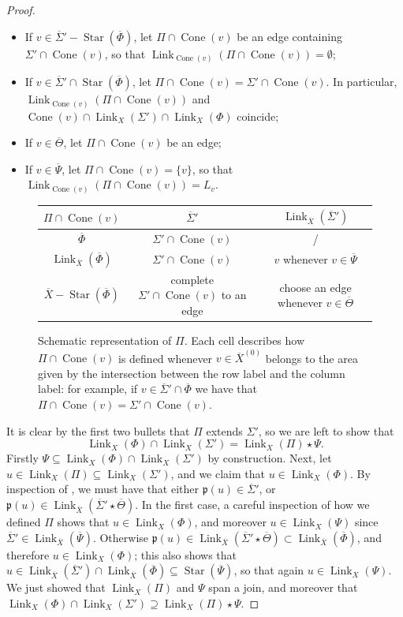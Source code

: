 \documentclass[svgnames]{amsart}
\theoremstyle{plain}
\theoremstyle{definition}
\newcommand{\link}[2]{\operatorname{Link}_{#1}\left(#2\right)}
\newcommand{\CStar}[1]{\operatorname{Star}\left(#1\right)}
\newcommand{\p}{\mathfrak{p}}
\newcommand{\Cone}[1]{\operatorname{Cone}\left(#1\right)}
\newcommand{\ov}[1]{\overline{#1}}
\begin{document}
\begin{proof}
\begin{itemize}
        \item If $v\in \ov\Sigma'-\CStar{\ov\Phi}$, let $\Pi\cap \Cone{v}$ be an edge containing $\Sigma'\cap \Cone{v}$, so that $\link{\Cone{v}}{\Pi\cap \Cone{v}}=\emptyset$;
        \item If $v\in \ov\Sigma'\cap\CStar{\ov\Phi}$, let $\Pi\cap \Cone{v}=\Sigma'\cap \Cone{v}$. In particular, $\link{\Cone{v}}{\Pi\cap \Cone{v}}$ and $\Cone{v}\cap\link{X}{\Sigma'}\cap\link{X}{\Phi}$ coincide;
        \item If $v\in \ov\Theta$, let $\Pi\cap \Cone{v}$ be an edge;
        \item If $v\in \ov\Psi$, let $\Pi\cap \Cone{v}=\{v\}$, so that $\link{\Cone{v}}{\Pi\cap \Cone{v}}=L_v$.
    \end{itemize}

    
\begin{figure}[htp]
\centering
\renewcommand{\arraystretch}{1.5}
\begin{tabular}{c|c|c}
$\Pi\cap \Cone v$&$\ov\Sigma'$&$\link{\ov X}{\ov \Sigma'}$\\
\hline
$\ov\Phi$&  $\Sigma'\cap \Cone v$&/\\
$\link{\ov X}{\ov \Phi}$&$\Sigma'\cap \Cone v$& $v$ whenever $v\in \ov\Psi$\\
$\ov X- \CStar{\ov\Phi}$&complete $\Sigma'\cap \Cone v$ to an edge& choose an edge whenever $v\in \ov\Theta$
\end{tabular}
    \caption{Schematic representation of $\Pi$. Each cell describes how $\Pi\cap \Cone v$ is defined whenever $v\in\ov X^{(0)}$ belongs to the area given by the intersection between the row label and the column label: for example, if $v\in\ov\Sigma'\cap \ov\Phi$ we have that $\Pi\cap \Cone v=\Sigma'\cap \Cone v$.}
    \label{tab:Sigma_star_Pi}
\end{figure}

\noindent It is clear by the first two bullets that $\Pi$ extends $\Sigma'$, so we are left to show that $$\link{X}{\Phi}\cap\link{X}{\Sigma'}=\link{X}{\Pi}\star\Psi.$$ Firstly $\Psi\subseteq\link{X}{\Phi}\cap\link{X}{\Sigma'}$ by construction. Next, let $u\in \link{X}{\Pi}\subseteq \link{X}{\Sigma'}$, and we claim that $u\in \link{X}{\Phi}$. By inspection of , we must have that either $\p(u)\in \ov\Sigma'$, or $\p(u)\in \link{\ov X}{\ov\Sigma'\star\ov \Theta}$. In the first case, a careful inspection of how we defined $\Pi$ shows that $u\in \link{ X}{\Phi}$, and moreover $u\in \link{X}{\Psi}$ since $\ov\Sigma'\in \link{\ov X}{\ov \Psi}$. Otherwise $\p(u)\in \link{\ov X}{\ov\Sigma'\star\ov \Theta}\subset\link{\ov X}{\ov\Phi}$, and therefore $u\in\link{X}{\Phi}$; this also shows that $u\in \link{\ov X}{\ov\Sigma'}\cap\link{\ov X}{\ov\Phi}\subseteq\CStar{\ov\Psi}$, so that again $u\in \link{X}{\Psi}$. We just showed that $\link{X}{\Pi}$ and $\Psi$ span a join, and moreover that $\link{X}{\Phi}\cap\link{X}{\Sigma'}\supseteq \link{X}{\Pi}\star\Psi$.


\end{proof}
\end{document}
